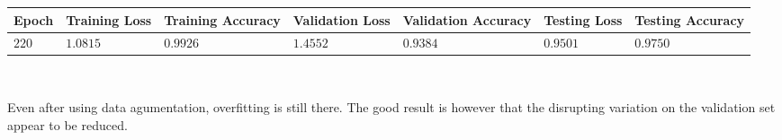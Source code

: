 \documentclass[11pt,a4paper]{article}
\begin{document}
\begin{center}
\hspace*{-0.8cm}
\begin{tabular}{|p{1.2cm}|p{1.8cm}|p{2cm}|p{2cm}|p{2cm}|p{2cm}|p{2cm}|}
\rowcolor{gray!50}
\hline
\textbf{Epoch} & \textbf{Training Loss} & \textbf{Training Accuracy} & \textbf{Validation Loss} & \textbf{Validation Accuracy} & \textbf{Testing Loss} & \textbf{Testing Accuracy}\\
\hline
$220$ & $1.0815$ & $0.9926$ & $1.4552$ & $0.9384$ & $0.9501$ & $0.9750$\\
\hline
\end{tabular}\\
\end{center}
Even after using data agumentation, overfitting is still there. The good result is however that the disrupting variation on the validation set appear to be reduced.
\end{document}
